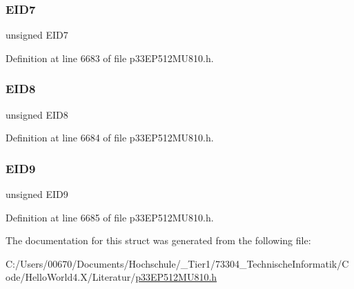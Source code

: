 \subsubsection{\texorpdfstring{E\+I\+D7}{EID7}}
{\footnotesize\ttfamily unsigned E\+I\+D7}



Definition at line 6683 of file p33\+E\+P512\+M\+U810.\+h.

\mbox{\label{structtag_c2_r_x_f8_e_i_d_b_i_t_s_acca25e0b7d86eb499d01f85222baea87}} 
\subsubsection{\texorpdfstring{E\+I\+D8}{EID8}}
{\footnotesize\ttfamily unsigned E\+I\+D8}



Definition at line 6684 of file p33\+E\+P512\+M\+U810.\+h.

\mbox{\label{structtag_c2_r_x_f8_e_i_d_b_i_t_s_ac6748f73d4ada8538b06548be4f396c2}} 
\subsubsection{\texorpdfstring{E\+I\+D9}{EID9}}
{\footnotesize\ttfamily unsigned E\+I\+D9}



Definition at line 6685 of file p33\+E\+P512\+M\+U810.\+h.



The documentation for this struct was generated from the following file\+:\begin{DoxyCompactItemize}
\item 
C\+:/\+Users/00670/\+Documents/\+Hochschule/\+\_\+\+Tier1/73304\+\_\+\+Technische\+Informatik/\+Code/\+Hello\+World4.\+X/\+Literatur/\hyperlink{p33_e_p512_m_u810_8h}{p33\+E\+P512\+M\+U810.\+h}\end{DoxyCompactItemize}
